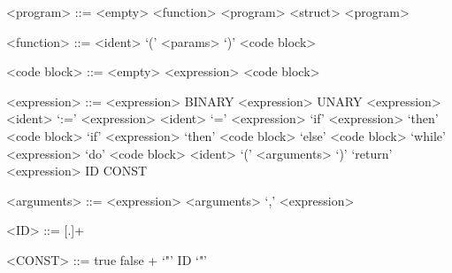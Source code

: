 \documentclass{article}
\begin{document}
\setlength{\grammarparsep}{20pt plus 1pt minus 1pt}
\setlength{\grammarindent}{12em}

\begin{grammar}
<program> ::= <empty>
\alt <function> <program>
\alt <struct> <program>

<function> ::= <ident> `(' <params> `)' <code block>

<code block> ::= <empty>
\alt <expression> <code block>

<expression> ::= <expression> BINARY <expression>
\alt UNARY <expression>
\alt <ident> `:=' <expression>
\alt <ident> `=' <expression>
\alt `if' <expression> `then' <code block>
\alt `if' <expression> `then' <code block> `else' <code block>
\alt `while' <expression> `do' <code block>
\alt <ident> `(' <arguments> `)'
\alt `return' <expression>
\alt ID
\alt CONST

<arguments> ::= <expression>
\alt <arguments> `,' <expression>

<ID> ::= [.]+

<CONST> ::= true
\alt false
\alt [0-9]+
\alt `"' ID `"'
\end{grammar}
\end{document}
